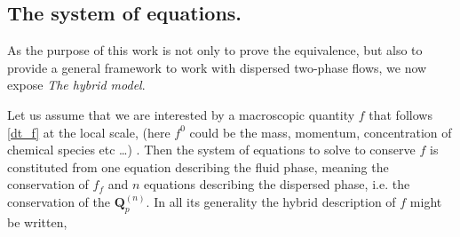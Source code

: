 \subsection{The system of equations.}

As the purpose of this work is not only to prove the equivalence, but also to provide a general framework to work with dispersed two-phase flows, we now expose \textit{The hybrid model}.

Let us assume that we are interested by a macroscopic quantity $f$ that follows \ref{dt_f} at the local scale, (here $f^0$ could be the mass, momentum, concentration of chemical species etc \ldots) . 
Then the system of equations to solve to conserve $f$ is constituted from one equation describing the fluid phase, meaning the conservation of $f_f$ and $n$ equations describing the dispersed phase, i.e. the conservation of the $\textbf{Q}_p^{(n)}$.  
In all its generality the hybrid description of $f$ might be written,
